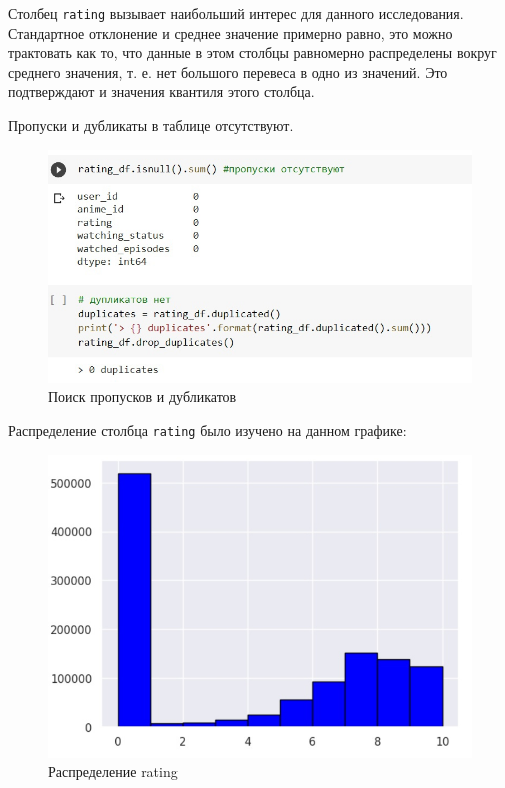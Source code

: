 \documentclass[bachelor, och, diploma]{SCWorks}
\begin{document}
Столбец \verb|rating| вызывает наибольший интерес для данного исследования. Стандартное отклонение и среднее значение примерно равно,
 это можно трактовать как то, что данные в этом столбцы равномерно распределены вокруг среднего значения, 
 т. е. нет большого перевеса в одно из значений. Это подтверждают и значения квантиля этого столбца.

Пропуски и дубликаты в таблице отсутствуют.

\begin{figure}[H]

	\centering
	
	\includegraphics[width=0.8\linewidth]{analis2.png}
	
	\caption{Поиск пропусков и дубликатов}
	
	\label{fig:a2}
	
\end{figure}

Распределение столбца \verb|rating| было изучено на данном графике:
\begin{figure}[h]

	\centering
	
	\includegraphics[width=0.8\linewidth]{analis3.png}
	
	\caption{Распределение rating}
	
	\label{fig:a3}
	
\end{figure}
\end{document}
